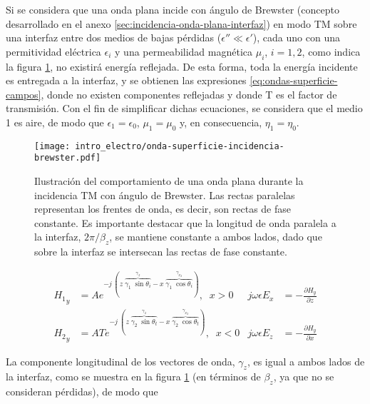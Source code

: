 Si se considera que una onda plana incide con ángulo de Brewster (concepto desarrollado en el anexo \ref{sec:incidencia-onda-plana-interfaz}) en modo TM sobre una interfaz entre dos medios de bajas pérdidas ($\epsilon'' \ll \epsilon'$), cada uno con una permitividad eléctrica $\epsilon_i$ y una permeabilidad magnética $\mu_i$, $i=1,2$, como indica la figura \ref{fig:onda-superficie-brewster}, no existirá energía reflejada. De esta forma, toda la energía incidente es entregada a la interfaz, y se obtienen las expresiones \ref{eq:ondas-superficie-campos}, donde no existen componentes reflejadas y donde T es el factor de transmisión. Con el fin de simplificar dichas ecuaciones, se considera que el medio 1 es aire, de modo que $\epsilon_1 = \epsilon_0$, $\mu_1 = \mu_0$ y, en consecuencia, $\eta_1 = \eta_0$.

\begin{figure}[htp]
	\centering
	\texttt{[image: intro\_electro/onda-superficie-incidencia-brewster.pdf]}
	\caption{Ilustración del comportamiento de una onda plana durante la incidencia TM con ángulo de Brewster. Las rectas paralelas representan los frentes de onda, es decir, son rectas de fase constante. Es importante destacar que la longitud de onda paralela a la interfaz, $2\pi/\beta_z$, se mantiene constante a ambos lados, dado que sobre la interfaz se intersecan las rectas de fase constante.}
	\label{fig:onda-superficie-brewster}
\end{figure}

\begin{subequations}
	\label{eq:ondas-superficie-campos}
	\begin{align}
	{H_1}_y &= A e^{-j\ (z\; \overbrace{\gamma_1\;\sin \theta_i}^{\gamma_z} - x\; \overbrace{\gamma_1\;\cos \theta_i}^{\gamma_{x_2}})},\;\; x>0 & j\omega\epsilon E_x &= -\frac{\partial H_y}{\partial z} \\
	{H_2}_y &= A T e^{-j\; (z\; \overbrace{\gamma_2\; \sin \theta_t}^{\gamma_z} - x\; \overbrace{\gamma_2\; \cos \theta_t}^{\gamma_{x_2}})},\;\; x<0   & j\omega\epsilon E_z &= -\frac{\partial H_y}{\partial x} 
	\end{align}
\end{subequations}

La componente longitudinal de los vectores de onda, $\gamma_z$, es igual a ambos lados de la interfaz, como se muestra en la figura \ref{fig:onda-superficie-brewster} (en términos de $\beta_z$, ya que no se consideran pérdidas), de modo que

